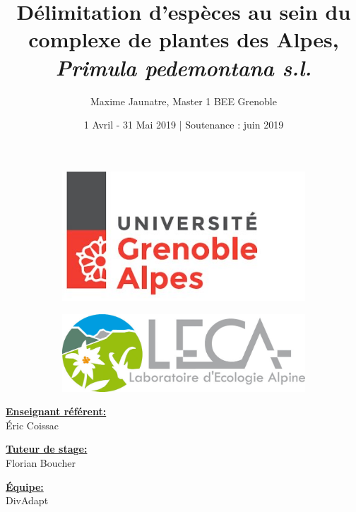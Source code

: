 \documentclass[12pt,a4paper,notitlepage]{article}
\title{\textbf{Délimitation d'espèces au sein du complexe de plantes des Alpes, \textit{Primula pedemontana s.l.}}}
\author{Maxime Jaunatre, Master 1 BEE Grenoble}
\date{1 Avril - 31 Mai 2019  |  Soutenance : juin 2019 }
\begin{document}
\begin{titlepage} %
\begin{figure}
  \centering
\begin{subfigure}{0.4\textwidth}
  \includegraphics[width=0.7\linewidth,left]{fig/UGA.jpg}
\end{subfigure}%
\begin{subfigure}{.4\textwidth}
  \includegraphics[width=0.7\linewidth,right]{fig/leca.jpg}
\end{subfigure}
\label{fig:test}
\end{figure}
\maketitle


\noindent
\begin{minipage}{1.3in}
\textbf{\underline{Enseignant référent:}} \\
Éric Coissac
\end{minipage}
\hfill
\begin{minipage}{1.3in}
\textbf{\underline{Tuteur de stage:}} \\
Florian Boucher
\end{minipage}
\hfill
\begin{minipage}{1.3in}
\textbf{\underline{Équipe:}} \\
DivAdapt
\end{minipage}


\end{titlepage}
\end{document}
